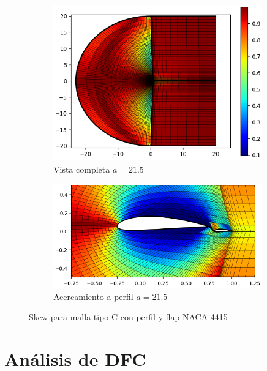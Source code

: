 \documentclass[letterpaper, openright, 12pt]{book}
\begin{document}
\begin{figure}[htbp!]
\begin{subfigure}[c]{0.48\textwidth}
            \includegraphics[keepaspectratio, width=0.99\textwidth]
                {./img/naca4415_c_flap_aa_215_skew_far}
            \caption{Vista completa $a = 21.5$}
            \label{fig:naca4415_c_flap_aa_215_skew_far}
        \end{subfigure}
        \hfill
        \begin{subfigure}[c]{0.48\textwidth}
            \includegraphics[keepaspectratio, width=0.99\textwidth]
                {./img/naca4415_c_flap_aa_215_skew_close}
            \caption{Acercamiento a perfil $a = 21.5$}
            \label{fig:naca4415_c_flap_aa_215_skew_close}
        \end{subfigure}
        \caption{Skew para malla tipo C con perfil y flap NACA 4415}
        \label{fig:naca4415_c_flap_skew_1}
    \end{figure}

    \goodbreak\pagebreak
    \section{Análisis de DFC}
\end{document}
